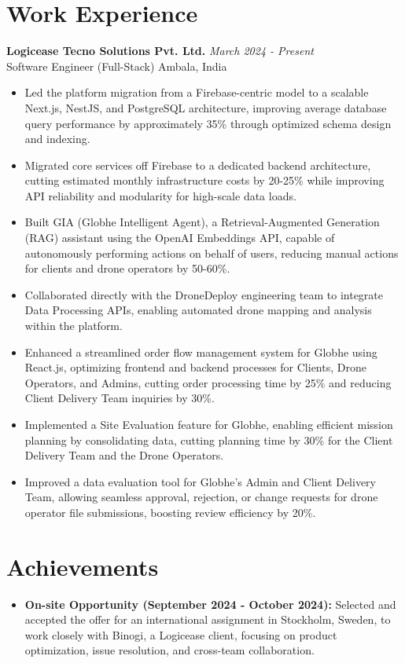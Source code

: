 \documentclass[10pt,a4paper]{article}
\newcommand{\entry}[4]{%
  \noindent\textbf{#1} \hfill \textit{#2}\\
  \noindent#3 \hfill #4\\[2pt]%
}
\begin{document}
\section*{Work Experience}
\entry{Logicease Tecno Solutions Pvt. Ltd.}{March 2024 - Present}{Software Engineer (Full-Stack)}{Ambala, India}
\begin{itemize}
  \item Led the platform migration from a Firebase-centric model to a scalable Next.js, NestJS, and PostgreSQL architecture, improving average database query performance by approximately 35\% through optimized schema design and indexing.
  \item Migrated core services off Firebase to a dedicated backend architecture, cutting estimated monthly infrastructure costs by 20-25\% while improving API reliability and modularity for high-scale data loads.
  \item Built GIA (Globhe Intelligent Agent), a \mbox{Retrieval-Augmented} Generation (RAG) assistant using the OpenAI Embeddings API, capable of autonomously performing actions on behalf of users, reducing manual actions for clients and drone operators by 50-60\%.
  \item Collaborated directly with the DroneDeploy engineering team to integrate Data Processing APIs, enabling automated drone mapping and analysis within the platform.
  \item Enhanced a streamlined order flow management system for Globhe using React.js, optimizing frontend and backend processes for Clients, Drone Operators, and Admins, cutting order processing time by 25\% and reducing Client Delivery Team inquiries by 30\%.
  \item Implemented a Site Evaluation feature for Globhe, enabling efficient mission planning by consolidating data, cutting planning time by 30\% for the Client Delivery Team and the Drone Operators.
  \item Improved a data evaluation tool for Globhe's Admin and Client Delivery Team, allowing seamless approval, rejection, or change requests for drone operator file submissions, boosting review efficiency by 20\%.
\end{itemize}

\section*{Achievements}
\begin{itemize}
  \item \textbf{On-site Opportunity (September 2024 - October 2024):} Selected and accepted the offer for an international assignment in Stockholm, Sweden, to work closely with Binogi, a Logicease client, focusing on product optimization, issue resolution, and cross-team collaboration.
\end{itemize}
\end{document}

